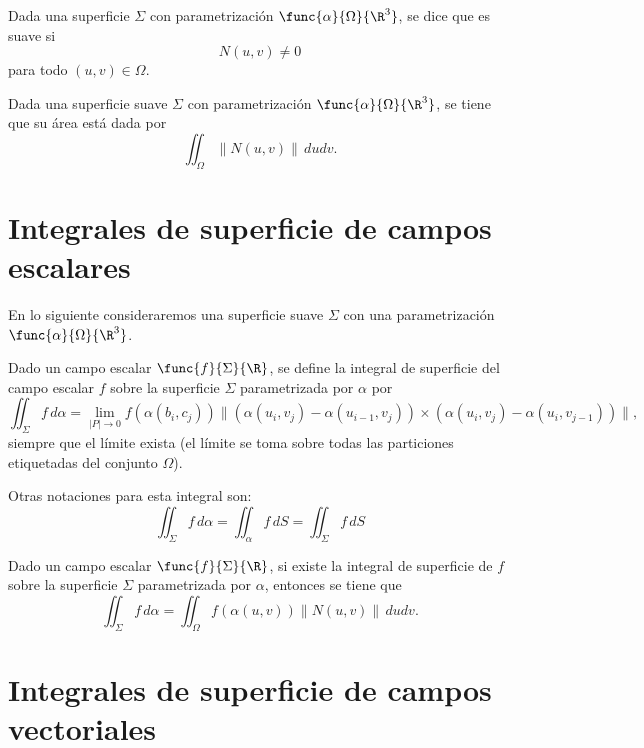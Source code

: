 \documentclass[a4,11pt]{aleph-notas}
\begin{document}
\begin{defi}
    Dada una superficie $\Sigma$ con parametrización $\func{\alpha}{\Omega}{\R^3}$, se dice que es suave si
    \[
        N(u,v) \neq 0
    \]
    para todo $(u,v)\in \Omega$.
\end{defi}

\begin{prop}
    Dada una superficie suave $\Sigma$ con parametrización $\func{\alpha}{\Omega}{\R^3}$, se tiene que su área está dada por
    \[
        \iint_\Omega \|N(u,v)\| \,dudv.
    \]
\end{prop}

\section{Integrales de superficie de campos escalares}

En lo siguiente consideraremos una superficie suave $\Sigma$ con una parametrización $\func{\alpha}{\Omega}{\R^3}$.

\begin{defi}
    Dado un campo escalar $\func{f}{\Sigma}{\R}$, se define la integral de superficie del campo escalar $f$ sobre la superficie $\Sigma$ parametrizada por $\alpha$ por
    \[
        \iint_\Sigma f\, d\alpha
        = \lim_{|P|\to 0} f(\alpha(b_i,c_j)) \| (\alpha(u_i,v_j)- \alpha(u_{i-1},v_j)) \times (\alpha(u_i,v_j)- \alpha(u_i,v_{j-1}))\|,
    \]
    siempre que el límite exista (el límite se toma sobre todas las particiones etiquetadas del conjunto $\Omega$).
\end{defi}

\begin{advertencia}
    Otras notaciones para esta integral son:
    \[
        \iint_\Sigma f\, d\alpha
        = \iint_\alpha f\, dS
        = \iint_\Sigma f \,dS
    \]
\end{advertencia}

\begin{teo}
    Dado un campo escalar $\func{f}{\Sigma}{\R}$, si existe la integral de superficie de $f$ sobre la superficie $\Sigma$ parametrizada por $\alpha$, entonces se tiene que
    \[
        \iint_\Sigma f\, d\alpha
        =\iint_\Omega f(\alpha(u,v))\|N(u,v)\|\,dudv.
    \]
\end{teo}

\section{Integrales de superficie de campos vectoriales}
\end{document}
